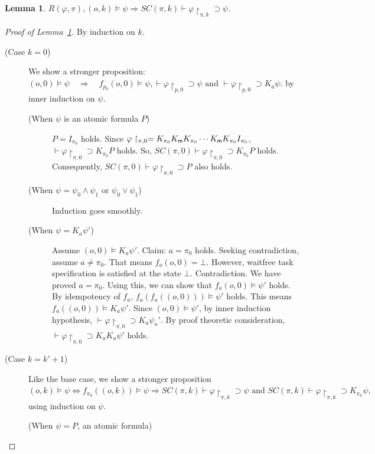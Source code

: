 \documentclass[doctor]{iscs-thesis}
\newcommand{\memory}{{\sf m}}
\newtheorem{lemma}{Lemma}
\begin{document}
\begin{lemma}
 \label{stronger}
 $R(\varphi, \pi), (o,k)\models \psi\Longrightarrow SC(\pi, k)\vdash
 \varphi\restriction_{\pi,k}\supset\psi$.
\end{lemma}
\begin{proof}[Proof of Lemma~\ref{stronger}]
 By induction on $k$.
\begin{description}
 \item[(Case $k=0$)] 
 We show a stronger proposition:
$
 (o,0)\models \psi \quad\Longrightarrow\quad f_{p_0}(o,0)\models \psi,
 \vdash \varphi\restriction_{p,0}\supset \psi
 \mbox{ and }
 \vdash \varphi\restriction_{p,0}\supset K_a\psi.
$
by inner induction on $\psi$.
\begin{description}
 \item[(When $\psi$ is an atomic formula $P$)] 
 $P = I_{\pi_0}$ holds.
 Since $\varphi\restriction_{\pi,0} = K_{\pi_0}K_\memory K_{\pi_0}\cdots K_\memory K_{\pi_0}I_{\pi_0}$,
 $\vdash\varphi\restriction_{\pi,0}\supset K_{\pi_0}P$ holds.
 So, $SC(\pi,0)\vdash \varphi\restriction_{\pi,0}\supset K_{\pi_0}P$ holds.
 Consequently, $SC(\pi,0)\vdash \varphi\restriction_{\pi,0}\supset P$ also holds.
 \item[(When $\psi = \psi_0\wedge \psi_1$ or $\psi_0\vee\psi_1$)] 
 Induction goes smoothly.
 \item[(When $\psi = K_a\psi'$)]
 Assume $(o,0)\models K_a\psi'$. Claim: $a=\pi_0$ holds.
 Seeking contradiction, assume $a\neq \pi_0$.
 That means $f_a(o,0) = \bot$.
 However, waitfree task specification is satisfied at the state $\bot$.
 Contradiction.
 We have proved $a=\pi_0$. Using this, we can show that $f_a(o,0)\models\psi'$ holds.
 By idempotency of $f_a$, $f_a(f_a((o,0)))\models \psi'$ holds.
 This means $f_a((o,0))\models K_a\psi'$.
 Since $(o,0)\models \psi'$, by inner induction hypothesis,
 $\vdash \varphi\restriction_{\pi,0}\supset K_a\psi_a'$.
 By proof theoretic consideration,
 $\vdash \varphi\restriction_{\pi,0}\supset K_a K_a\psi'$ holds.
\end{description}
 \item[(Case $k = k' + 1$)]
 Like the base case, we show a stronger proposition
$
 (o,k)\models \psi\Leftrightarrow f_{\pi_k}((o,k))\models \psi \Rightarrow SC(\pi,k)\vdash
 \varphi\restriction_{\pi,k}\supset \psi\mbox{ and }SC(\pi,k)\vdash
 \varphi\restriction_{\pi,k}\supset K_{\pi_k}\psi, 
$
using induction on $\psi$.
\begin{description}
 \item[(When $\psi = P$, an atomic formula)] 

\end{description}
\end{description}
\end{proof}
\end{document}
